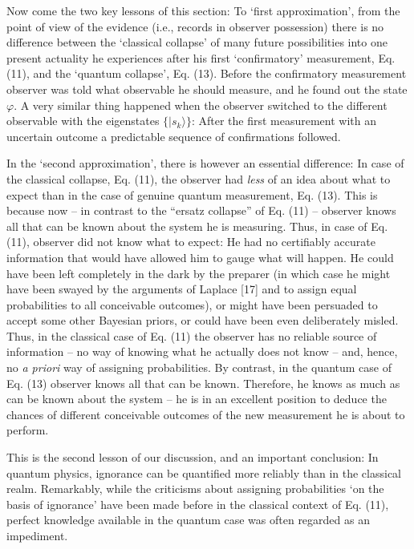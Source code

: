 \documentclass[aps,pra,epsfig,11pt,floatfix]{revtex4}
\begin{document}
Now come the two key lessons of this section: To `first approximation', from
the point of view of the evidence (i.e., records in observer possession) 
there is no difference between the `classical collapse' of many future 
possibilities into one present actuality he experiences after his first 
`confirmatory' measurement, Eq. (11), and the `quantum collapse', Eq. (13). 
Before the confirmatory measurement observer was told what observable 
he should measure, and he found out the state $\varphi$. A very similar
thing happened when the observer switched to the different observable with
the eigenstates $\{|s_k\rangle\}$: After the first measurement with
an uncertain outcome a predictable sequence of confirmations followed.

In the `second approximation', there is however an essential difference: In
case of the classical collapse, Eq. (11), the observer had {\it less} of an idea
about what to expect than in the case of genuine quantum measurement, Eq. (13).
This is because now -- in contrast to the ``ersatz collapse'' of Eq. (11) --
observer knows all that can be known about the system he is measuring. Thus,
in case of Eq. (11), observer did not know what to expect: He had no certifiably
accurate information that would have allowed him to gauge what will happen. He
could have been left completely in the dark by the preparer (in which case he
might have been swayed by the arguments of Laplace [17] and to assign equal
probabilities to all conceivable outcomes), or might have been persuaded to
accept some other Bayesian priors, or could have been even deliberately misled.
Thus, in the classical case of Eq. (11) the observer has no reliable source of
information -- no way of knowing what he actually does not know -- and, hence,
no {\it a priori} way of assigning probabilities. By contrast, in the quantum
case of Eq. (13) observer knows all that can be known. Therefore, he knows as
much as can be known about the system -- he is in an excellent position to
deduce the chances of different conceivable outcomes of the new measurement
he is about to perform.

This is the second lesson of our discussion, and an important conclusion:
In quantum physics, ignorance can be quantified more reliably than
in the classical realm. Remarkably, while the criticisms about assigning
probabilities `on the basis of ignorance' have been made before
in the classical context of Eq. (11), perfect knowledge available in the
quantum case was often regarded as an impediment.
\end{document}
